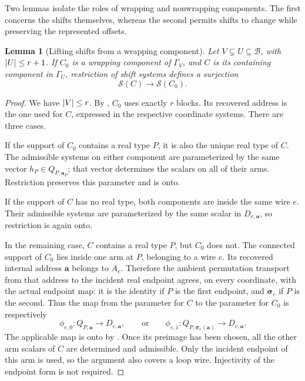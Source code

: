 \documentclass[11pt]{article}
\newtheorem{lemma}[theorem]{Lemma}
\theoremstyle{definition}
\newcommand{\cB}{\mathcal B}
\DeclarePairedDelimiter{\abs}{\lvert}{\rvert}
\begin{document}
Two lemmas isolate the roles of wrapping and nonwrapping components.
The first concerns the shifts themselves, whereas the second permits
shifts to change while preserving the represented offsets.

\begin{lemma}[Lifting shifts from a wrapping component]
\label{offset:lem-wrapping-lift}
Let \(V\subsetneq U\subseteq\cB\), with \(\abs{U}\le r+1\).
If \(C_0\) is a wrapping component of \(\Gamma_V\), and \(C\) is its
containing component in \(\Gamma_U\), restriction of shift systems defines
a surjection
\[
    \mathcal S(C)\longrightarrow\mathcal S(C_0).
\]
\end{lemma}

\begin{proof}
We have \(\abs{V}\le r\). By , \(C_0\) uses
exactly \(r\) blocks. Its recovered address is the one used for \(C\),
expressed in the respective coordinate systems. There are three cases.

If the support of \(C_0\) contains a real type \(P\), it is also the
unique real type of \(C\). The admissible systems on either component
are parameterized by the same vector \(h_P\in Q_{P,\mathbf a_P}\);
that vector determines the scalars on all of their arms. Restriction
preserves this parameter and is onto.

If the support of \(C\) has no real type, both components are inside the
same wire \(e\). Their admissible systems are parameterized by the same
scalar in \(D_{e,\mathbf a}\), so restriction is again onto.

In the remaining case, \(C\) contains a real type \(P\), but \(C_0\) does
not. The connected support of \(C_0\) lies inside one arm at \(P\),
belonging to a wire \(e\). Its recovered internal address
\(\mathbf a\) belongs to \(A_e\). Therefore the ambient permutation
transport from that address to the incident real endpoint agrees, on
every coordinate, with the actual endpoint map: it is the identity if
\(P\) is the first endpoint, and \(\boldsymbol\sigma_e\) if \(P\) is the
second. Thus the map from the parameter for \(C\) to the parameter for
\(C_0\) is respectively
\[
 \phi_{e,0}:Q_{P,\mathbf a}\longrightarrow D_{e,\mathbf a},
 \qquad\text{or}\qquad
 \phi_{e,1}:Q_{P,\boldsymbol\sigma_e(\mathbf a)}
                    \longrightarrow D_{e,\mathbf a}.
\]
The applicable map is onto by .
Once its preimage has been chosen, all the other arm scalars of \(C\)
are determined and admissible. Only the incident endpoint of this arm
is used, so the argument also covers a loop wire. Injectivity of the
endpoint form is not required.
\end{proof}
\end{document}
